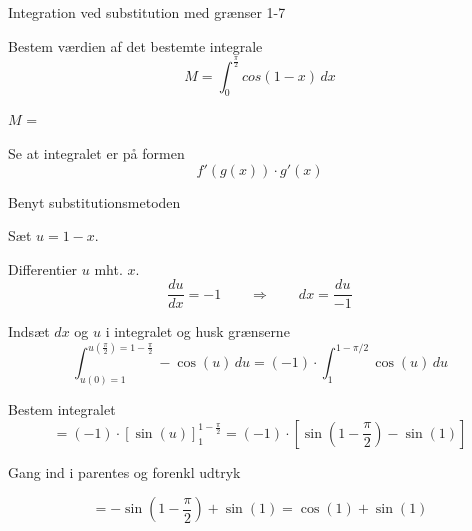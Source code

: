 \documentclass{article}
\begin{document}
\begin{exercise}{Integration ved substitution med grænser 1-7}
	
	
	Bestem værdien af det bestemte integrale
	\[
	M = \int_0^{\frac{\pi}{2}} cos(1-x) \, dx
	\]
	
	$M$ =  \\
	
	
	
	\hint
	
	Se at integralet er på formen
	\[
	f'(g(x)) \cdot g'(x)
	\]
	
	\hint
	
	Benyt substitutionsmetoden
	
	\hint
	
	Sæt $u=1-x$.
	
	
	\hint
	
	Differentier $u$ mht. $x$.
	\[
	\frac{du}{dx} = -1 \qquad	\Rightarrow \qquad dx = \frac{du}{-1}
	\]
	
	\hint
	
	Indsæt $dx$ og $u$ i integralet og husk grænserne
	\[
	\int_{u(0)=1}^{u(\frac{\pi}{2})=1-\frac{\pi}{2}} -\cos(u) \, du =  (-1) \cdot \int_1^{1-\pi/2} \cos(u) \, du
	\]
	
	\hint
	
	Bestem integralet
	\[
	= (-1) \cdot  \left[ \sin(u) \right]_1^{1-\frac{\pi}{2}} =  (-1) \cdot  \left[ \sin\left(1-\frac{\pi}{2}\right) - \sin(1) \right]
	\]
	
	
	\hint
	
	Gang ind i parentes og forenkl udtryk
	
	\hint
	
	\[
	= -\sin\left(1-\frac{\pi}{2}\right) + \sin(1) = \cos(1) + \sin(1)
	\]
	
	
\end{exercise}

\newpage
\end{document}
